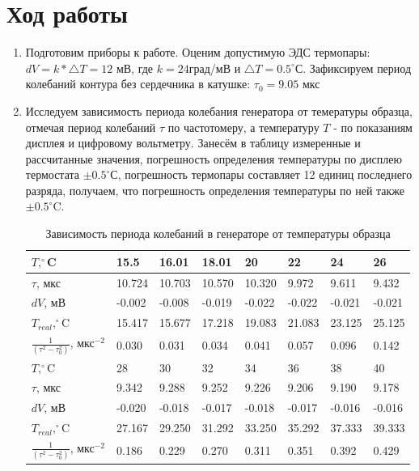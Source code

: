 \documentclass[a4paper]{article}
\begin{document}
\section{Ход работы}
\begin{enumerate}
    \item Подготовим приборы к работе. Оценим допустимую ЭДС термопары: $dV = k * \triangle T = 12$ мВ, где $k = 24$град/мВ и $\triangle T = 0.5 ^{\circ}$С. Зафиксируем период колебаний контура без сердечника в катушке: $\tau_0 = 9.05$ мкс
    \item Исследуем зависимость периода колебания генератора от темературы образца, отмечая период колебаний $\tau$ по частотомеру, а температуру $T$ - по показаниям дисплея и цифровому вольтметру. Занесём в таблицу измеренные и рассчитанные значения, погрешность определения температуры по дисплею термостата $\pm 0.5^{\circ}$С, погрешность термопары составляет 12 единиц последнего разряда, получаем, что погрешность определения температуры по ней также $\pm 0.5^{\circ}$C.
    
   \begin{table}[h]
    \centering
    \begin{center}
    \caption{Зависимость периода колебаний в генераторе от температуры образца}
    \end{center}
    \vspace{0.1cm}
    \label{tab:my_label}
    \begin{tabular}{ |p{2.3cm}||p{1.2cm}|p{1.2cm}|p{1.2cm}|p{1.2cm}|p{1.2cm}|p{1.2cm}|p{1.2cm}| }
 \hline
    $T, ^{\circ}$C & 15.5 & 16.01 & 18.01 & 20 & 22 & 24 & 26 \\
\hline
    $\tau$, мкс & 10.724 & 10.703 & 10.570 & 10.320 & 9.972 & 9.611 & 9.432 \\
\hline
    $dV$, мВ & -0.002 & -0.008 & -0.019 & -0.022 & -0.022 & -0.021 & -0.021\\
\hline
    $T_{real}, ^{\circ}$C & 15.417 & 15.677 & 17.218 & 19.083 & 21.083 & 23.125 & 25.125 \\
\hline
    $\frac{1}{(\tau^2-\tau_0^2)}$, мкс$^{-2}$ & 0.030 & 0.031 & 0.034 & 0.041 & 0.057 & 0.096 & 0.142 \\
\hline
\hline
    $T, ^{\circ}$C & 28 & 30 & 32 & 34 & 36 & 38 & 40 \\
\hline
    $\tau$, мкс & 9.342 & 9.288 & 9.252 & 9.226 & 9.206 & 9.190 & 9.178 \\
\hline
    $dV$, мВ & -0.020 & -0.018 & -0.017 & -0.018 & -0.017 & -0.016 & -0.016\\
\hline
    $T_{real}, ^{\circ}$C & 27.167 & 29.250 & 31.292 & 33.250 & 35.292 & 37.333 & 39.333 \\
\hline
    $\frac{1}{(\tau^2-\tau_0^2)}$, мкс$^{-2}$ & 0.186 & 0.229 & 0.270 & 0.311 & 0.351 & 0.392 & 0.429 \\
\hline
\hline    
       \end{tabular}
\end{table}


\end{enumerate}
\end{document}
